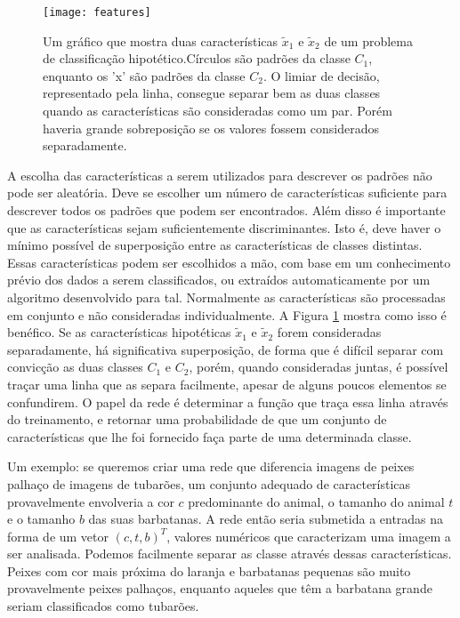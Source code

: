 \begin{figure}[!ht]
\centering
\texttt{[image: features]}
\caption[Um gráfico que mostra duas características $\tilde{x}_1$ e $\tilde{x}_2$ de um problema de classificação hipotético.]{Um gráfico que mostra duas características $\tilde{x}_1$ e $\tilde{x}_2$ de um problema de classificação hipotético.\protect\footnotemark  Círculos são padrões da classe $C_1$, enquanto os 'x' são padrões da classe $C_2$. O limiar de decisão, representado pela linha, consegue separar bem as duas classes quando as características são consideradas como um par. Porém haveria grande sobreposição se os valores fossem considerados separadamente.}
\label{fig:features}
\centering
\end{figure}
A escolha das características a serem utilizados para descrever os padrões não pode ser aleatória. Deve se escolher um número de características suficiente para descrever todos os padrões que podem ser encontrados. Além disso é importante que as características sejam suficientemente discriminantes. Isto é, deve haver o mínimo possível de superposição entre as características de classes distintas. Essas características podem ser escolhidos a mão, com base em um conhecimento prévio dos dados a serem classificados, ou extraídos automaticamente por um algoritmo desenvolvido para tal. Normalmente as características são processadas em conjunto e não consideradas individualmente. A Figura \ref{fig:features} mostra como isso é benéfico. Se as características hipotéticas $\tilde{x}_1$ e $\tilde{x}_2$ forem consideradas separadamente, há significativa superposição, de forma que é difícil separar com convicção as duas classes $C_1$ e $C_2$, porém, quando consideradas juntas, é possível traçar uma linha que as separa facilmente, apesar de alguns poucos elementos se confundirem. O papel da rede é determinar a função que traça essa linha através do treinamento, e retornar uma probabilidade de que um conjunto de características que lhe foi fornecido faça parte de uma determinada classe.



Um exemplo: se queremos criar uma rede que diferencia imagens de peixes palhaço de imagens de tubarões, um conjunto adequado de características provavelmente envolveria a cor $c$ predominante do animal, o tamanho do animal $t$ e o tamanho $b$ das suas barbatanas. A rede então seria submetida a entradas na forma de um vetor $(c, t, b)^T$, valores numéricos que caracterizam uma imagem a ser analisada. Podemos facilmente separar as classe através dessas características. Peixes com cor mais próxima do laranja e barbatanas pequenas são muito provavelmente peixes palhaços, enquanto aqueles que têm a barbatana grande seriam classificados como tubarões.


